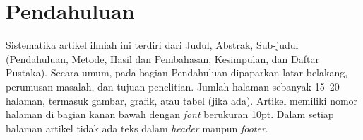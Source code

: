 \section{Pendahuluan}


Sistematika artikel ilmiah ini terdiri dari Judul, Abstrak, Sub-judul (Pendahuluan, Metode, Hasil dan Pembahasan, Kesimpulan, dan Daftar Pustaka). Secara umum, pada bagian Pendahuluan dipaparkan latar belakang, perumusan masalah, dan tujuan penelitian. Jumlah halaman sebanyak 15--20 halaman, termasuk gambar, grafik, atau tabel (jika ada). Artikel memiliki nomor halaman di bagian kanan bawah dengan \textit{font} berukuran 10pt. Dalam setiap halaman artikel tidak ada teks dalam \textit{header} maupun \textit{footer}.